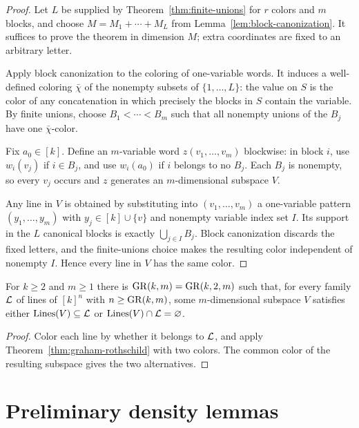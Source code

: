 \begin{proof}
Let $L$ be supplied by Theorem~\ref{thm:finite-unions} for $r$ colors and $m$ blocks, and choose
$M=M_1+\cdots+M_L$ from Lemma~\ref{lem:block-canonization}.  It suffices to prove the theorem in
dimension $M$; extra coordinates are fixed to an arbitrary letter.

Apply block canonization to the coloring of one-variable words.  It induces a well-defined coloring
$\bar\chi$ of the nonempty subsets of $\{1,\ldots,L\}$: the value on $S$ is the color of any
concatenation in which precisely the blocks in $S$ contain the variable.  By finite unions, choose
$B_1<\cdots<B_m$ such that all nonempty unions of the $B_j$ have one $\bar\chi$-color.

Fix $a_0\in[k]$.  Define an $m$-variable word $z(v_1,\ldots,v_m)$ blockwise: in block $i$, use
$w_i(v_j)$ if $i\in B_j$, and use $w_i(a_0)$ if $i$ belongs to no $B_j$.  Each $B_j$ is nonempty,
so every $v_j$ occurs and $z$ generates an $m$-dimensional subspace $V$.

Any line in $V$ is obtained by substituting into $(v_1,\ldots,v_m)$ a one-variable pattern
$(y_1,\ldots,y_m)$ with $y_j\in[k]\cup\{v\}$ and nonempty variable index set $I$.  Its support in
the $L$ canonical blocks is exactly $\bigcup_{j\in I}B_j$.  Block canonization discards the fixed
letters, and the finite-unions choice makes the resulting color independent of nonempty $I$.
Hence every line in $V$ has the same color.
\end{proof}

\begin{corollary}
\label{cor:gr-two-color}
For $k\geq2$ and $m\geq1$ there is $\operatorname{GR}(k,m)=\operatorname{GR}(k,2,m)$ such that, for every family
$\mathcal{L}$ of lines of $[k]^n$ with $n\geq\operatorname{GR}(k,m)$, some $m$-dimensional subspace $V$ satisfies
either $\operatorname{Lines}(V)\subseteq\mathcal{L}$ or $\operatorname{Lines}(V)\cap\mathcal{L}=\varnothing$.
\end{corollary}

\begin{proof}
Color each line by whether it belongs to $\mathcal{L}$, and apply Theorem~\ref{thm:graham-rothschild}
with two colors.  The common color of the resulting subspace gives the two alternatives.
\end{proof}


\chapter{Preliminary density lemmas}
\label{chap:prelim}

